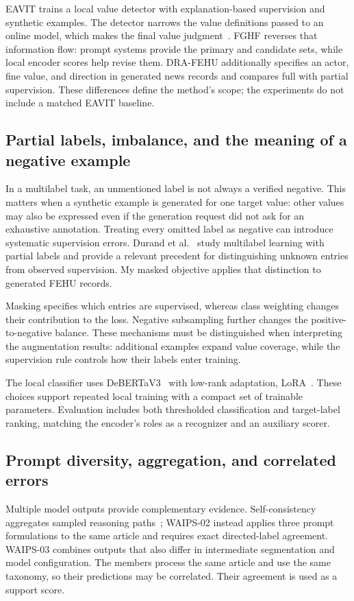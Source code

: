 \documentclass[12pt,a4paper]{article}
\begin{document}
EAVIT trains a local value detector with explanation-based supervision and synthetic examples. The detector narrows the value definitions passed to an online model, which makes the final value judgment~\cite{eavit}. FGHF reverses that information flow: prompt systems provide the primary and candidate sets, while local encoder scores help revise them. DRA-FEHU additionally specifies an actor, fine value, and direction in generated news records and compares full with partial supervision. These differences define the method's scope; the experiments do not include a matched EAVIT baseline.


\subsection{Partial labels, imbalance, and the meaning of a negative example}
In a multilabel task, an unmentioned label is not always a verified negative. This matters when a synthetic example is generated for one target value: other values may also be expressed even if the generation request did not ask for an exhaustive annotation. Treating every omitted label as negative can introduce systematic supervision errors. Durand et al.~\cite{durand2019} study multilabel learning with partial labels and provide a relevant precedent for distinguishing unknown entries from observed supervision. My masked objective applies that distinction to generated FEHU records.

Masking specifies which entries are supervised, whereas class weighting changes their contribution to the loss. Negative subsampling further changes the positive-to-negative balance. These mechanisms must be distinguished when interpreting the augmentation results: additional examples expand value coverage, while the supervision rule controls how their labels enter training.

The local classifier uses DeBERTaV3~\cite{debertav3} with low-rank adaptation, LoRA~\cite{lora}. These choices support repeated local training with a compact set of trainable parameters. Evaluation includes both thresholded classification and target-label ranking, matching the encoder's roles as a recognizer and an auxiliary scorer.

\subsection{Prompt diversity, aggregation, and correlated errors}
Multiple model outputs provide complementary evidence. Self-consistency aggregates sampled reasoning paths~\cite{selfconsistency}; WAIPS-02 instead applies three prompt formulations to the same article and requires exact directed-label agreement. WAIPS-03 combines outputs that also differ in intermediate segmentation and model configuration. The members process the same article and use the same taxonomy, so their predictions may be correlated. Their agreement is used as a support score.
\end{document}
